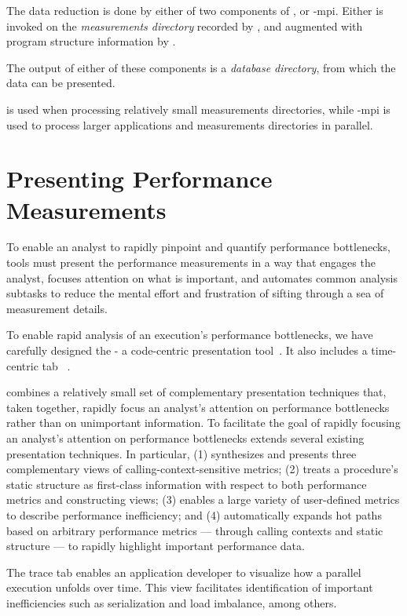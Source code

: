 \documentclass[11pt,twoside,letterpaper]{report}
\begin{document}
The data reduction is done by either of two components of \HPCToolkit{}, \hpcprof{} or \hpcprof-mpi{}.
Either is invoked on the  \emph{measurements directory} recorded by \hpcrun{}, and augmented with program
structure information by \hpcstruct {}.

The output of either of these
components is a  \emph{database directory}, from which the data can be presented.

\hpcprof{} is used when processing relatively small measurements directories, while \hpcprof-mpi{} is used to
process larger applications and measurements directories in parallel.


\section{Presenting Performance Measurements}

To enable an analyst to rapidly pinpoint and quantify performance bottlenecks, tools must present the performance measurements in a way that engages the analyst, focuses attention on what is important, and automates common analysis subtasks to reduce the mental effort and frustration of sifting through a sea of measurement details.

To enable rapid analysis of an execution's performance bottlenecks, we have carefully designed the \hpcviewer{}
- a code-centric presentation tool~\cite{Adhianto-MC-Ta:2010:PSTI-hpcviewer}.  It also includes a time-centric tab
~\cite{Tallent-MC-etal:2011:ICS-hpctoolkit-scalable-tracing}.

\hpcviewer{} combines a relatively small set of complementary presentation techniques that, taken together, rapidly focus an analyst's attention on performance bottlenecks rather than on unimportant information.
To facilitate the goal of rapidly focusing an analyst's attention on performance bottlenecks \hpcviewer{}
extends several existing presentation techniques.
In particular, \hpcviewer{} (1) synthesizes and presents three complementary views of calling-context-sensitive metrics;
(2) treats a procedure's static structure as first-class information with respect to both performance metrics
and constructing views; (3) enables a large variety of user-defined metrics to describe performance inefficiency;
and (4) automatically expands hot paths based on arbitrary performance metrics --- through calling contexts and static structure --- to rapidly highlight important performance data.

The trace tab enables an application developer to visualize how a parallel execution unfolds over time.
This view facilitates identification of important inefficiencies such as serialization and load imbalance, among others.
\end{document}
